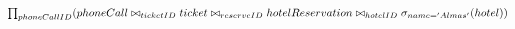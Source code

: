 \setLTR
$
\prod_{phoneCallID}(phoneCall \bowtie_{ticketID}ticket\bowtie_{reserveID}hotelReservation \bowtie_{hotelID}\sigma_{name='Almas'}(hotel))
\\$
\setRTL